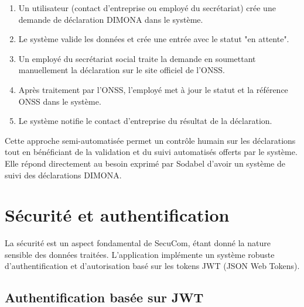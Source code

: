\begin{tcolorbox}[
  title={\textbf{Flux de traitement d'une déclaration DIMONA}},
  colback=blue!5!white,
  colframe=primarycolor,
  fonttitle=\bfseries,
  boxrule=0.5mm,
  arc=2mm,
  left=6mm,
  right=6mm,
  top=6mm,
  bottom=6mm
]
\begin{enumerate}[itemsep=0.3em]
  \item Un utilisateur (contact d'entreprise ou employé du secrétariat) crée une demande de déclaration DIMONA dans le système.
  \item Le système valide les données et crée une entrée avec le statut "en attente".
  \item Un employé du secrétariat social traite la demande en soumettant manuellement la déclaration sur le site officiel de l'ONSS.
  \item Après traitement par l'ONSS, l'employé met à jour le statut et la référence ONSS dans le système.
  \item Le système notifie le contact d'entreprise du résultat de la déclaration.
\end{enumerate}
\end{tcolorbox}

\vspace{0.5cm}

\begin{note}
Cette approche semi-automatisée permet un contrôle humain sur les déclarations tout en bénéficiant de la validation et du suivi automatisés offerts par le système. Elle répond directement au besoin exprimé par Sodabel d'avoir un système de suivi des déclarations DIMONA.
\end{note}

\newpage
\section{Sécurité et authentification}

La sécurité est un aspect fondamental de SecuCom, étant donné la nature sensible des données traitées. L'application implémente un système robuste d'authentification et d'autorisation basé sur les tokens JWT (JSON Web Tokens).

\vspace{0.5cm}

\subsection{Authentification basée sur JWT}

